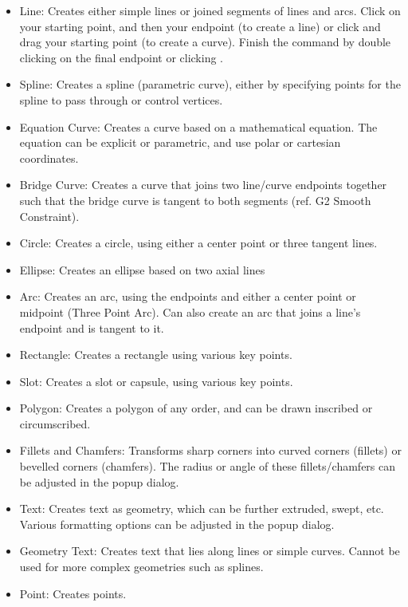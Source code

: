 \begin{itemize}
\item Line: Creates either simple lines or joined segments of lines and arcs. Click on your starting point, and then your endpoint (to create a line) or click and drag your starting point (to create a curve). Finish the command by double clicking on the final endpoint or clicking .
\item Spline: Creates a spline (parametric curve), either by specifying points for the spline to pass through or control vertices. 
\item Equation Curve: Creates a curve based on a mathematical equation. The equation can be explicit or parametric, and use polar or cartesian coordinates.
\item Bridge Curve: Creates a curve that joins two line/curve endpoints together such that the bridge curve is tangent to both segments (ref. G2 Smooth Constraint).
\item Circle: Creates a circle, using either a center point or three tangent lines.
\item Ellipse: Creates an ellipse based on two axial lines
\item Arc: Creates an arc, using the endpoints and either a center point or midpoint (Three Point Arc). Can also create an arc that joins a line's endpoint and is tangent to it.
\item Rectangle: Creates a rectangle using various key points.
\item Slot: Creates a slot or capsule, using various key points.
\item Polygon: Creates a polygon of any order, and can be drawn inscribed or circumscribed.
\item Fillets and Chamfers: Transforms sharp corners into curved corners (fillets) or bevelled corners (chamfers). The radius or angle of these fillets/chamfers can be adjusted in the popup dialog.
\item Text: Creates text as geometry, which can be further extruded, swept, etc. Various formatting options can be adjusted in the popup dialog.
\item Geometry Text: Creates text that lies along lines or simple curves. Cannot be used for more complex geometries such as splines.
\item Point: Creates points.

\end{itemize}

